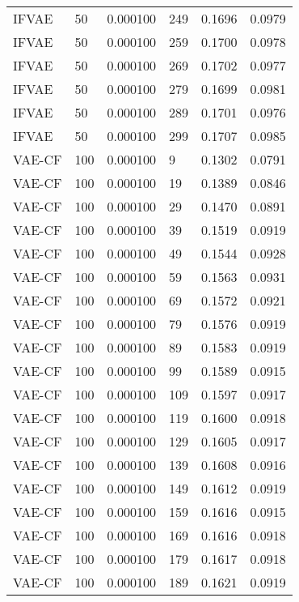 \begin{tabular}{llrlrr}
   IFVAE &   50 &  0.000100 &   249 &  0.1696 &       0.0979 \\
   IFVAE &   50 &  0.000100 &   259 &  0.1700 &       0.0978 \\
   IFVAE &   50 &  0.000100 &   269 &  0.1702 &       0.0977 \\
   IFVAE &   50 &  0.000100 &   279 &  0.1699 &       0.0981 \\
   IFVAE &   50 &  0.000100 &   289 &  0.1701 &       0.0976 \\
   IFVAE &   50 &  0.000100 &   299 &  0.1707 &       0.0985 \\
  VAE-CF &  100 &  0.000100 &     9 &  0.1302 &       0.0791 \\
  VAE-CF &  100 &  0.000100 &    19 &  0.1389 &       0.0846 \\
  VAE-CF &  100 &  0.000100 &    29 &  0.1470 &       0.0891 \\
  VAE-CF &  100 &  0.000100 &    39 &  0.1519 &       0.0919 \\
  VAE-CF &  100 &  0.000100 &    49 &  0.1544 &       0.0928 \\
  VAE-CF &  100 &  0.000100 &    59 &  0.1563 &       0.0931 \\
  VAE-CF &  100 &  0.000100 &    69 &  0.1572 &       0.0921 \\
  VAE-CF &  100 &  0.000100 &    79 &  0.1576 &       0.0919 \\
  VAE-CF &  100 &  0.000100 &    89 &  0.1583 &       0.0919 \\
  VAE-CF &  100 &  0.000100 &    99 &  0.1589 &       0.0915 \\
  VAE-CF &  100 &  0.000100 &   109 &  0.1597 &       0.0917 \\
  VAE-CF &  100 &  0.000100 &   119 &  0.1600 &       0.0918 \\
  VAE-CF &  100 &  0.000100 &   129 &  0.1605 &       0.0917 \\
  VAE-CF &  100 &  0.000100 &   139 &  0.1608 &       0.0916 \\
  VAE-CF &  100 &  0.000100 &   149 &  0.1612 &       0.0919 \\
  VAE-CF &  100 &  0.000100 &   159 &  0.1616 &       0.0915 \\
  VAE-CF &  100 &  0.000100 &   169 &  0.1616 &       0.0918 \\
  VAE-CF &  100 &  0.000100 &   179 &  0.1617 &       0.0918 \\
  VAE-CF &  100 &  0.000100 &   189 &  0.1621 &       0.0919 \\

\end{tabular}
